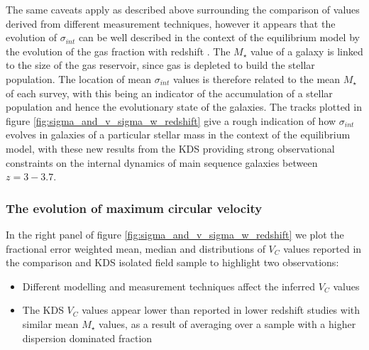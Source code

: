 \documentclass[fleqn,usenatbib]{mn2e}
\begin{document}
The same caveats apply as described above surrounding the comparison of values derived from different measurement techniques, however it appears that the evolution of $\sigma_{int}$ can be well described in the context of the equilibrium model by the evolution of the gas fraction with redshift \citep{Wisnioski2015}.
The $M_{\star}$ value of a galaxy is linked to the size of the gas reservoir, since gas is depleted to build the stellar population.
The location of mean $\sigma_{int}$ values is therefore related to the mean $M_{\star}$ of each survey, with this being an indicator of the accumulation of a stellar population and hence the evolutionary state of the galaxies.
The tracks plotted in figure \ref{fig:sigma_and_v_sigma_w_redshift} give a rough indication of how $\sigma_{int}$ evolves in galaxies of a particular stellar mass in the context of the equilibrium model, with these new results from the KDS providing strong observational constraints on the internal dynamics of main sequence galaxies between $z=3-3.7$.

\subsubsection{The evolution of maximum circular velocity}\label{subsubsec:v_evolution}
In the right panel of figure \ref{fig:sigma_and_v_sigma_w_redshift} we plot the fractional error weighted mean, median and distributions of $V_{C}$ values reported in the comparison and KDS isolated field sample to highlight two observations:
\begin{itemize}
    \item Different modelling and measurement techniques affect the inferred $V_{C}$ values
    \item The KDS $V_{C}$ values appear lower than reported in lower redshift studies with similar mean $M_{\star}$ values, as a result of averaging over a sample with a higher dispersion dominated fraction
\end{itemize}
\end{document}
